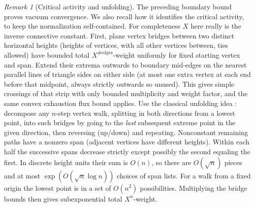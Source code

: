 \documentclass[11pt]{article}
\numberwithin{equation}{section}
\theoremstyle{definition}\newtheorem{definition}[theorem]{Definition}
\theoremstyle{remark}\newtheorem{remark}[theorem]{Remark}
\begin{document}
\begin{remark}[Critical activity and unfolding]
The preceding boundary bound proves vacuum convergence. We also recall how it identifies the critical activity, to keep the normalization self-contained. For completeness \(X\) here really is the inverse connective constant. First, plane vertex bridges between two distinct horizontal heights (heights of vertices, with all other vertices between, ties allowed) have bounded total \(X^{\#\text{edges}}\)-weight uniformly for fixed starting vertex and span. Extend their extrema outwards to boundary mid-edges on the nearest parallel lines of triangle sides on either side (at most one extra vertex at each end before that midpoint, always strictly outwards so unused). This gives simple crossings of that strip with only bounded multiplicity and weight factor, and the same convex exhaustion flux bound applies. Use the classical unfolding idea \cite{HammersleyWelsh1962,MadrasSlade1993}: decompose any \(n\)-step vertex walk, splitting in both directions from a lowest point, into such bridges by going to the \emph{last} subsequent extreme point in the given direction, then reversing (up/down) and repeating. Nonconstant remaining paths have a nonzero span (adjacent vertices have different heights). Within each half the successive spans decrease strictly except possibly the second equaling the first. In discrete height units their sum is \(O(n)\), so there are \(O(\sqrt n)\) pieces and at most \(\exp(O(\sqrt n\log n))\) choices of span lists. For a walk from a fixed origin the lowest point is in a set of \(O(n^2)\) possibilities. Multiplying the bridge bounds then gives subexponential total \(X^n\)-weight.


\end{remark}
\end{document}
